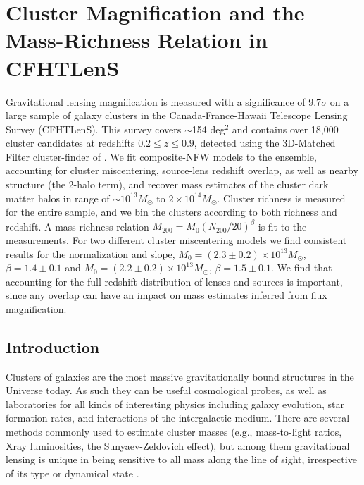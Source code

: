 
\chapter{Cluster Magnification and the Mass-Richness Relation in CFHTLenS}
\label{ch3}

Gravitational lensing magnification is measured with a significance of 9.7$\sigma$ on a large sample of galaxy clusters in the Canada-France-Hawaii Telescope Lensing Survey (CFHTLenS). This survey covers $\sim$154 deg$^2$ and contains over 18,000 cluster candidates at redshifts $0.2 \leq z \leq 0.9$, detected using the 3D-Matched Filter cluster-finder of \citet{Milkeraitis10}. We fit composite-NFW models to the ensemble, accounting for cluster miscentering, source-lens redshift overlap, as well as nearby structure (the 2-halo term), and recover mass estimates of the cluster dark matter halos in range of $\sim10^{13} M_\odot$ to $2\times10^{14} M_\odot$. Cluster richness is measured for the entire sample, and we bin the clusters according to both richness and redshift. A mass-richness relation $M_{200} = M_0 (N_{200} / 20)^\beta$ is fit to the measurements. For two different cluster miscentering models we find consistent results for the normalization and slope,  $M_0 = (2.3 \pm 0.2) \times 10^{13} M_\odot$, $\beta = 1.4 \pm 0.1$ and $M_0 = (2.2 \pm 0.2) \times 10^{13} M_\odot$, $\beta = 1.5 \pm 0.1$. We find that accounting for the full redshift distribution of lenses and sources is important, since any overlap can have an impact on mass estimates inferred from flux magnification.


\section{Introduction}
Clusters of galaxies are the most massive gravitationally bound structures in the Universe today. As such they can be useful cosmological probes, as well as laboratories for all kinds of interesting physics including galaxy evolution, star formation rates, and interactions of the intergalactic medium. There are several methods commonly used to estimate cluster masses (e.g., mass-to-light ratios, Xray luminosities, the Sunyaev-Zeldovich effect), but among them gravitational lensing is unique in being sensitive to all mass along the line of sight, irrespective of its type or dynamical state \citep{BS01}.

